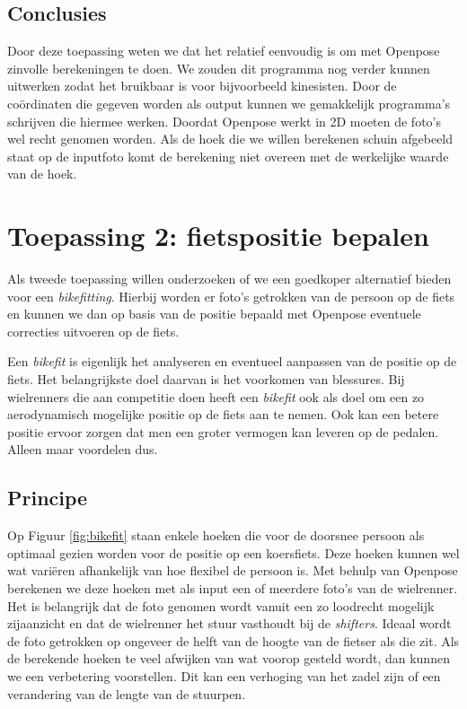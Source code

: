 \documentclass[a4paper,twoside,kulak]{kulakreport}
\begin{document}
\subsection{Conclusies}
Door deze  toepassing weten we dat het relatief eenvoudig is om met Openpose zinvolle berekeningen te doen. We zouden dit programma nog verder kunnen uitwerken zodat het bruikbaar is voor bijvoorbeeld kinesisten. Door de coördinaten die gegeven worden als output kunnen we gemakkelijk programma's schrijven die hiermee werken. Doordat Openpose werkt in 2D moeten de foto's wel recht genomen worden. Als de hoek die we willen berekenen schuin afgebeeld staat op de inputfoto komt de berekening niet overeen met de werkelijke waarde van de hoek.


\section{Toepassing 2: fietspositie bepalen}
Als tweede toepassing willen onderzoeken of we een goedkoper alternatief bieden voor een \textit{bikefitting}. Hierbij worden er foto's getrokken van de persoon op de fiets en kunnen we dan op basis van de positie bepaald met Openpose eventuele correcties uitvoeren op de fiets.

Een \emph{bikefit} is eigenlijk het analyseren en eventueel aanpassen van de positie op de fiets. Het belangrijkste doel daarvan is het voorkomen van blessures. Bij wielrenners die aan competitie doen heeft een \emph{bikefit} ook als doel om een zo aerodynamisch mogelijke positie op de fiets aan te nemen. Ook kan een betere positie ervoor zorgen dat men een groter vermogen kan leveren op de pedalen. Alleen maar voordelen dus.

\subsection{Principe}

Op Figuur \ref{fig:bikefit} staan enkele hoeken die voor de doorsnee persoon als optimaal gezien worden voor de positie op een koersfiets. Deze hoeken kunnen wel wat variëren afhankelijk van hoe flexibel de persoon is. Met behulp van Openpose berekenen we deze hoeken met als input een of meerdere foto's van de wielrenner. Het is belangrijk dat de foto genomen wordt vanuit een zo loodrecht mogelijk zijaanzicht en dat de wielrenner het stuur vasthoudt bij de \emph{shifters}. Ideaal wordt de foto getrokken op ongeveer de helft van de hoogte van de fietser als die zit. Als de berekende hoeken te veel afwijken van wat voorop gesteld wordt, dan kunnen we een verbetering voorstellen. Dit kan een verhoging van het zadel zijn of een verandering van de lengte van de stuurpen.
\end{document}
